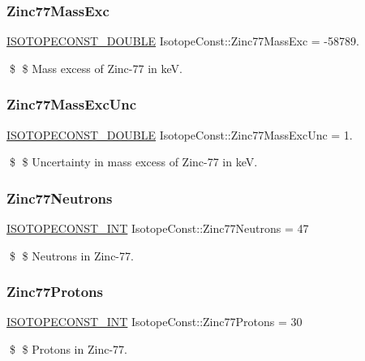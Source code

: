 \subsubsection{\texorpdfstring{Zinc77\+Mass\+Exc}{Zinc77MassExc}}
{\footnotesize\ttfamily \mbox{\hyperlink{group___isotope_const-_macros_ga8f45a7272ce02c0b4c65c44636ed719a}{I\+S\+O\+T\+O\+P\+E\+C\+O\+N\+S\+T\+\_\+\+D\+O\+U\+B\+LE}} Isotope\+Const\+::\+Zinc77\+Mass\+Exc = -\/58789.}

\$ \$ Mass excess of Zinc-\/77 in keV. \mbox{\label{group___isotope_const-_zinc-_zn77_ga12800d3294bad76a0795364d4e72868f}} 
\subsubsection{\texorpdfstring{Zinc77\+Mass\+Exc\+Unc}{Zinc77MassExcUnc}}
{\footnotesize\ttfamily \mbox{\hyperlink{group___isotope_const-_macros_ga8f45a7272ce02c0b4c65c44636ed719a}{I\+S\+O\+T\+O\+P\+E\+C\+O\+N\+S\+T\+\_\+\+D\+O\+U\+B\+LE}} Isotope\+Const\+::\+Zinc77\+Mass\+Exc\+Unc = 1.}

\$ \$ Uncertainty in mass excess of Zinc-\/77 in keV. \mbox{\label{group___isotope_const-_zinc-_zn77_gaf83b475d95442bf20d1c2afee7363bde}} 
\subsubsection{\texorpdfstring{Zinc77\+Neutrons}{Zinc77Neutrons}}
{\footnotesize\ttfamily \mbox{\hyperlink{group___isotope_const-_macros_ga5f18360b3e99483a35c32d789e62621c}{I\+S\+O\+T\+O\+P\+E\+C\+O\+N\+S\+T\+\_\+\+I\+NT}} Isotope\+Const\+::\+Zinc77\+Neutrons = 47}

\$ \$ Neutrons in Zinc-\/77. \mbox{\label{group___isotope_const-_zinc-_zn77_gad1f29d86127bbfd0b9ba11cf315a9091}} 
\subsubsection{\texorpdfstring{Zinc77\+Protons}{Zinc77Protons}}
{\footnotesize\ttfamily \mbox{\hyperlink{group___isotope_const-_macros_ga5f18360b3e99483a35c32d789e62621c}{I\+S\+O\+T\+O\+P\+E\+C\+O\+N\+S\+T\+\_\+\+I\+NT}} Isotope\+Const\+::\+Zinc77\+Protons = 30}

\$ \$ Protons in Zinc-\/77. 